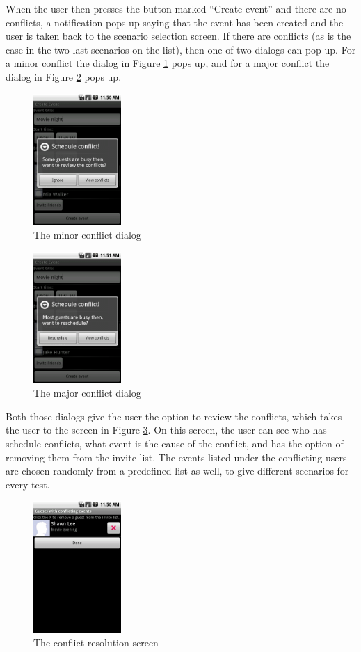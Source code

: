 \documentclass[]{report}
\begin{document}
When the user then presses the button marked ``Create event'' and there are no
conflicts, a notification pops up saying that the event has been created and the
user is taken back to the scenario selection screen. If there are conflicts (as
is the case in the two last scenarios on the list), then one of two dialogs can
pop up. For a minor conflict the dialog in Figure \ref{fig:minor} pops up, and
for a major conflict the dialog in Figure \ref{fig:major} pops up.

\begin{figure}[htb]
  \centering
  \includegraphics[height=50mm]{minor}
  \caption{The minor conflict dialog}
  \label{fig:minor}
\end{figure}

\begin{figure}[htb]
  \centering
  \includegraphics[height=50mm]{major}
  \caption{The major conflict dialog}
  \label{fig:major}
\end{figure}

Both those dialogs give the user the option to review the conflicts, which takes
the user to the screen in Figure \ref{fig:resolve}. On this screen, the user can
see who has schedule conflicts, what event is the cause of the conflict, and has
the option of removing them from the invite list. The events listed under the
conflicting users are chosen randomly from a predefined list as well, to give
different scenarios for every test.

\begin{figure}[htb]
  \centering
  \includegraphics[height=50mm]{resolution}
  \caption{The conflict resolution screen}
  \label{fig:resolve}
\end{figure}
\end{document}
